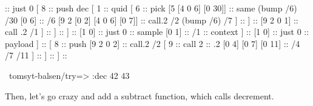 \begin{code}
[ 8                                          ::  push
  [                                          ::  cons
    [ 1                                      ::  quid     :: formula
      [ 1                                    ::  quid     :: decrement
        [ 8                                  ::  push
          [1 0]                              ::  just 0
          [ 8                                ::  push dec
            [ 1                              ::  quid
              [ 6                            ::  pick
                [5 [4 0 6] [0 30]]           ::  same (bump /6) /30
                [0 6]                        ::  /6
                [9 2 [0 2] [4 0 6] [0 7]]    ::  call.2 /2 (bump /6) /7
              ]                              ::
            ]                                :: 
            [9 2 0 1]                        ::  call .2 /1
          ]                                  ::
        ]                                    ::
      ]                                      ::
      [1 0]                                  ::  just 0   :: sample
      [0 1]                                  ::  /1       :: context
    ]                                        ::
    [1 0]                                    ::  just 0   :: payload
  ]                                          ::
  [ 8                                        ::  push
    [9 2 0 2]                                ::  call.2 /2
    [ 9                                      ::  call
      2                                      ::  .2
      [0 4] [0 7] [0 11]                     ::  /4 /7 /11
    ]                                        ::
  ]                                          ::
]                                            ::
                  
~tomsyt-balsen/try=> :dec 42
43
\end{code}
Then, let's go crazy and add a subtract function, which calls
decrement.

